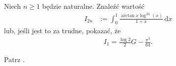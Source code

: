 %

\begin{problem_with_solution}
    \label{valean_1_24}%
    Niech $n \ge 1$ będzie naturalne.
    Znaleźć wartość
    \begin{align}
        I_{2n} & := \int_0^1 \frac {\arctan x \log^{2n} (x)}{1 + x } \,\mathrm{d}x
    \end{align} 
    lub, jeśli jest to za trudne, pokazać, że 
    \begin{align}
        I_{1} = \frac{\log 2}{2}G - \frac{\pi^3}{64}.
    \end{align} 
\end{problem_with_solution}


\begin{solution}
    Patrz \cite[s. 14, 15]{valean19}.
\end{solution}

%